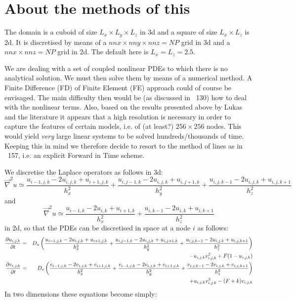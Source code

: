 \section*{About the methods of this \stone}

The domain is a cuboid of size $L_x \times L_y \times L_z$ in 3d and 
a square of size $L_x \times L_z$ is 2d.
It is discretised by means of a $nnx \times nny \times nnz = NP$ grid
in 3d and a $nnx \times nnz = NP$ grid in 2d.
The default here is $L_x=L_z=2.5$.

We are dealing with a set of coupled nonlinear PDEs to which there is no analytical solution.
We must then solve them by means of a numerical method. 
A Finite Difference (FD) of Finite Element (FE) approach could of course be envisaged. 
The main difficulty then would be (as discussed in \stone~130) how to deal with the 
nonlinear terms. Also, based on 
the results presented above by Lukas and the literature 
it appears that a high resolution is necessary in order
to capture the features of certain models, i.e. of (at least?) $256\times 256$ nodes. 
This would yield {\it very} large linear systems to be solved hundreds/thousands of time.
Keeping this in mind we therefore decide to resort to the method of lines as in \stone~157,
i.e. an explicit Forward in Time scheme.

We discretise the Laplace operators as follows in 3d:
\[
\vec\nabla^2 u \simeq 
\frac{u_{i-1,j,k}-2u_{i,j,k}+u_{i+1,j,k}}{h_x^2} + 
\frac{u_{i,j-1,k}-2u_{i,j,k}+u_{i,j+1,k}}{h_y^2} + 
\frac{u_{i,j,k-1}-2u_{i,j,k}+u_{i,j,k+1}}{h_z^2} 
\]
and
\[
\vec\nabla^2 u \simeq 
\frac{u_{i-1,k}-2u_{i,k}+u_{i+1,k}}{h_x^2} + 
\frac{u_{i,k-1}-2u_{i,k}+u_{i,k+1}}{h_z^2} 
\]
in 2d, so that the PDEs can be discretised in space at a node $i$ as follows:
\begin{eqnarray}
\frac{\partial u_{i,j,k}}{\partial t} 
&=& D_u 
\left(
\frac{u_{i-1,j,k}-2u_{i,j,k}+u_{i+1,j,k}}{h_x^2} + 
\frac{u_{i,j-1,k}-2u_{i,j,k}+u_{i,j+1,k}}{h_y^2} + 
\frac{u_{i,j,k-1}-2u_{i,j,k}+u_{i,j,k+1}}{h_z^2} 
\right) \nonumber\\
&&- u_{i,j,k}v_{i,j,k}^2 + F(1-u_{i,j,k}) 
\nonumber\\
\frac{\partial v_{i,j,k}}{\partial t} &=& D_v 
\left(
\frac{v_{i-1,j,k}-2v_{i,j,k}+v_{i+1,j,k}}{h_x^2} + 
\frac{v_{i-1,j,k}-2v_{i,j,k}+v_{i+1,j,k}}{h_y^2} + 
\frac{v_{i,j,k-1}-2v_{i,j,k}+v_{i,j,k+1}}{h_z^2} 
\right) \nonumber\\
&&
+ u_{i,j,k}v_{i,j,k}^2 - (F+k)v_{i,j,k} \nonumber
\end{eqnarray}
In two dimensions these equations become simply:

